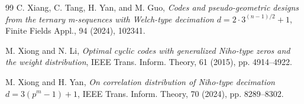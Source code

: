 \documentclass[hidelinks,onefignum,onetabnum]{siamart251216}
\theoremstyle{definition}
\theoremstyle{remark}
\begin{document}
\begin{thebibliography}{99}
	C. Xiang, C. Tang, H. Yan, and M. Guo, \emph{Codes and pseudo-geometric designs from the ternary m-sequences with Welch-type decimation $d=2\cdot 3^{(n-1)/2}+1$}, Finite Fields Appl., 94 (2024), 102341.
	
	M. Xiong and N. Li, \emph{Optimal cyclic codes with generalized Niho-type zeros and the weight distribution}, IEEE Trans. Inform. Theory, 61 (2015), pp. 4914--4922.
	
	M. Xiong and H. Yan, \emph{On correlation distribution of Niho-type decimation $d=3(p^{m}-1)+1$}, IEEE Trans. Inform. Theory, 70 (2024), pp. 8289--8302.
	
\end{thebibliography}
	
	
	
\end{document}
